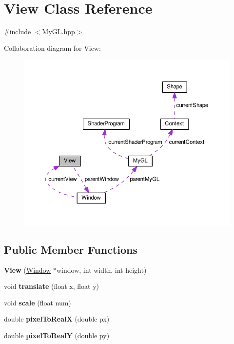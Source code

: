 \hypertarget{classView}{}\section{View Class Reference}
\label{classView}


{\ttfamily \#include $<$My\+G\+L.\+hpp$>$}



Collaboration diagram for View\+:\nopagebreak
\begin{figure}[H]
\begin{center}
\leavevmode
\includegraphics[width=350pt]{classView__coll__graph}
\end{center}
\end{figure}
\subsection*{Public Member Functions}
\begin{DoxyCompactItemize}
\item 
{\bfseries View} (\hyperlink{classWindow}{Window} $\ast$window, int width, int height)\hypertarget{classView_a8e2813e8beabcfee72e2ec2e05fd72bb}{}\label{classView_a8e2813e8beabcfee72e2ec2e05fd72bb}

\item 
void {\bfseries translate} (float x, float y)\hypertarget{classView_a2e97f6058d6a6690d9db72ceb43478a4}{}\label{classView_a2e97f6058d6a6690d9db72ceb43478a4}

\item 
void {\bfseries scale} (float num)\hypertarget{classView_ac31ae2aee1e5374df420b657b3040f6d}{}\label{classView_ac31ae2aee1e5374df420b657b3040f6d}

\item 
double {\bfseries pixel\+To\+RealX} (double px)\hypertarget{classView_ad6c9a0c29d23c21f333b346aa538472a}{}\label{classView_ad6c9a0c29d23c21f333b346aa538472a}

\item 
double {\bfseries pixel\+To\+RealY} (double py)\hypertarget{classView_adc37e8999407e00288c7ef8e36d7bea1}{}\label{classView_adc37e8999407e00288c7ef8e36d7bea1}

\end{DoxyCompactItemize}
